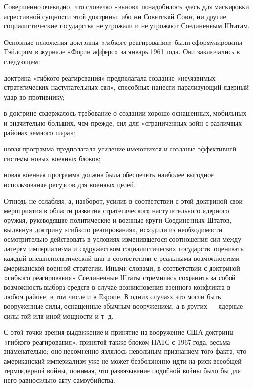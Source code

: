 \documentclass[12pt, a4paper, openany]{book}
\begin{document}
		Совершенно очевидно, что словечко «вызов» понадобилось здесь для маскировки агрессивной сущности этой доктрины, ибо ни Советский Союз, ни другие социалистические государства не угрожали и не угрожают Соединенным Штатам.
		
		Основные положения доктрины «гибкого реагирования» были сформулированы Тэйлором в журнале «Форин афферс» за январь 1961 года. Они заключались в следующем:
		
		доктрина «гибкого реагирования» предполагала создание «неуязвимых стратегических наступательных сил», способных нанести парализующий ядерный удар по противнику;
		
		в доктрине содержалось требование о создании хорошо оснащенных, мобильных и значительно больших, чем прежде, сил для «ограниченных войн с различных районах земного шара»;
		
		новая программа предполагала усиление имеющихся и создание эффективной системы новых военных блоков;
		
		новая военная программа должна была обеспечить наиболее выгодное использование ресурсов для военных целей.
		
		Отнюдь не ослабляя, а, наоборот, усилив в соответствии с этой доктриной свои мероприятия в области развития стратегического наступательного ядерного оружия, руководящие политические и военные круги Соединенных Штатов, выдвинув доктрину «гибкого реагирования», исходили из необходимости осмотрительно действовать в условиях изменившегося соотношения сил между лагерем империализма и содружеством социалистических государств, оценивать каждый внешнеполитический шаг в соответствии с реальными возможностями американской военной стратегии. Иными словами, в соответствии с доктриной «гибкого реагирования» Соединенные Штаты стремились сохранить за собой возможность выбора средств в случае возникновения военного конфликта в любом районе, в том числе и в Европе. В одних случаях это могли быть вооруженные силы, оснащенные обычным вооружением, а в других — ядерные силы той или иной мощности и т. д.
		
		
		С этой точки зрения выдвижение и принятие на вооружение США доктрины «гибкого реагирования», принятой также блоком НАТО с 1967 года, весьма знаменательно; оно несомненно являлось невольным признанием того факта, что американский империализм уже не может безбоязненно идти на риск всеобщей термоядерной войны, понимая, что развязывание подобной войны было бы для него равносильно акту самоубийства.
		
\end{document}
